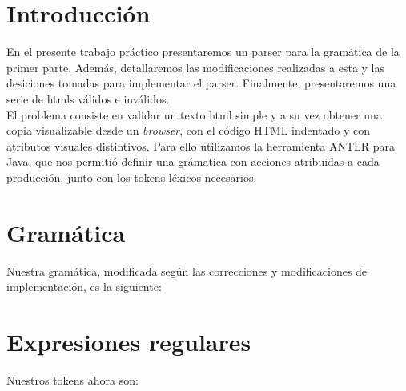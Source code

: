 \documentclass[11pt, a4paper, spanish]{article}
\newenvironment{borde}[1]
{\begin{lrbox}{\fmbox}\begin{minipage}{#1}}
{\end{minipage}\end{lrbox}\fbox{\usebox{\fmbox}}\\[10pt]}
\begin{document}
	


\section{Introducci\'on}

\indent En el presente trabajo pr\'actico presentaremos un parser para la gram\'atica de la primer parte. Adem\'as, detallaremos las modificaciones realizadas a esta y las desiciones tomadas para implementar el parser. Finalmente, presentaremos una serie de htmls v\'alidos e inv\'alidos. \\
\indent El problema consiste en validar un texto html simple y a su vez obtener una copia visualizable desde un \textit{browser}, con el c\'odigo HTML indentado y con atributos visuales distintivos. Para ello utilizamos la herramienta ANTLR para Java, que nos permiti\'o definir una gr\'amatica con acciones atribuidas a cada producci\'on, junto con los tokens l\'exicos necesarios.

\section{Gram\'atica}
\indent Nuestra gram\'atica, modificada seg\'un las correcciones y modificaciones de implementaci\'on, es la siguiente: \\
	

\section{Expresiones regulares}
\indent Nuestros tokens ahora son: \\
	
\newpage
\end{document}
